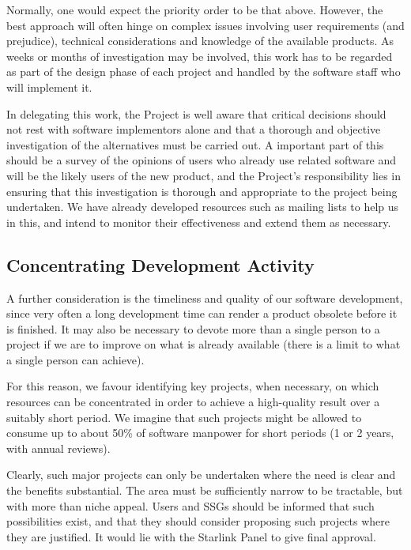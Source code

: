 \documentclass[twoside,11pt]{article}
\begin{document}
Normally, one would expect the priority order to be that
above. However, the best approach will often hinge on complex issues
involving user requirements (and prejudice), technical considerations
and knowledge of the available products. As weeks or months of
investigation may be involved, this work has to be regarded as part
of the design phase of each project and handled by the software staff
who will implement it.

In delegating this work, the Project is well aware that critical
decisions should not rest with software implementors alone and that a
thorough and objective investigation of the alternatives must be
carried out.  A important part of this should be a survey of the
opinions of users who already use related software and will be the
likely users of the new product, and the Project's responsibility lies
in ensuring that this investigation is thorough and appropriate to the
project being undertaken. We have already developed resources such as
mailing lists to help us in this, and intend to monitor their
effectiveness and extend them as necessary.

\subsection{Concentrating Development Activity}

A further consideration is the timeliness and quality of our software
development, since very often a long development time can render a
product obsolete before it is finished. It may also be necessary to
devote more than a single person to a project if we are to improve on
what is already available (there is a limit to what a single person
can achieve).

For this reason, we favour identifying key projects, when necessary, on
which resources can be concentrated in order to achieve a high-quality
result over a suitably short period. We imagine that such projects
might be allowed to consume up to about 50\% of software manpower for
short periods (1 or 2 years, with annual reviews).

Clearly, such major projects can only be undertaken where the need is
clear and the benefits substantial.  The area must be sufficiently
narrow to be tractable, but with more than niche appeal.  Users and
SSGs should be informed that such possibilities exist, and that they
should consider proposing such projects where they are justified. It
would lie with the Starlink Panel to give final approval.
\end{document}
